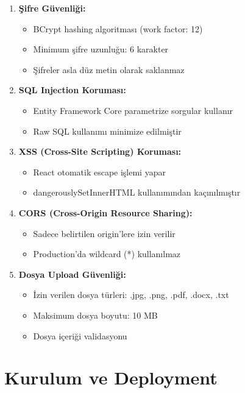 \documentclass[12pt,a4paper]{article}
\begin{document}
\begin{enumerate}
    \item \textbf{Şifre Güvenliği:}
    \begin{itemize}
        \item BCrypt hashing algoritması (work factor: 12)
        \item Minimum şifre uzunluğu: 6 karakter
        \item Şifreler asla düz metin olarak saklanmaz
    \end{itemize}
    
    \item \textbf{SQL Injection Koruması:}
    \begin{itemize}
        \item Entity Framework Core parametrize sorgular kullanır
        \item Raw SQL kullanımı minimize edilmiştir
    \end{itemize}
    
    \item \textbf{XSS (Cross-Site Scripting) Koruması:}
    \begin{itemize}
        \item React otomatik escape işlemi yapar
        \item dangerouslySetInnerHTML kullanımından kaçınılmıştır
    \end{itemize}
    
    \item \textbf{CORS (Cross-Origin Resource Sharing):}
    \begin{itemize}
        \item Sadece belirtilen origin'lere izin verilir
        \item Production'da wildcard (*) kullanılmaz
    \end{itemize}
    
    \item \textbf{Dosya Upload Güvenliği:}
    \begin{itemize}
        \item İzin verilen dosya türleri: .jpg, .png, .pdf, .docx, .txt
        \item Maksimum dosya boyutu: 10 MB
        \item Dosya içeriği validasyonu
    \end{itemize}
\end{enumerate}

\newpage

\section{Kurulum ve Deployment}
\end{document}
